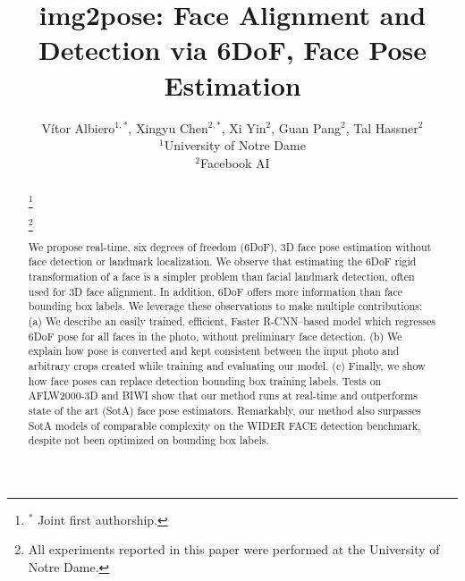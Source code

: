 \documentclass[final]{cvpr}
\newcommand\blfootnote[1]{\begingroup
  \renewcommand\thefootnote{}\footnote{#1}\addtocounter{footnote}{-1}\endgroup
}
\begin{document}
\title{img2pose: Face Alignment and Detection via 6DoF, Face Pose Estimation\vspace{-3mm}}

\author{Vítor Albiero$^{1,*}$, 
Xingyu Chen$^{2,*}$, Xi Yin$^2$, Guan Pang$^2$, Tal Hassner$^2$\\
$^1$University of Notre Dame\\
$^2$Facebook AI\\
}



\begin{abstract}
\blfootnote{$^*$ Joint first authorship.}
\blfootnote{All experiments reported in this paper were performed at the University of Notre Dame.}We propose real-time, six degrees of freedom (6DoF), 3D face pose estimation without face detection or landmark localization. We observe that estimating the 6DoF rigid transformation of a face is a simpler problem than facial landmark detection, often used for 3D face alignment. In addition, 6DoF offers more information than face bounding box labels. We leverage these observations to make multiple contributions: (a) We describe an easily trained, efficient, Faster R-CNN--based model which regresses 6DoF pose for all faces in the photo, without preliminary face detection. (b) We explain how pose is converted and kept consistent between the input photo and arbitrary crops created while training and evaluating our model. (c) Finally, we show how face poses can replace detection bounding box training labels. Tests on AFLW2000-3D and BIWI show that our method runs at real-time and outperforms state of the art (SotA) face pose estimators. Remarkably, our method also surpasses SotA models of comparable complexity on the WIDER FACE detection benchmark, despite not been optimized on bounding box labels.\vspace{-5mm}
\end{abstract}
\end{document}
